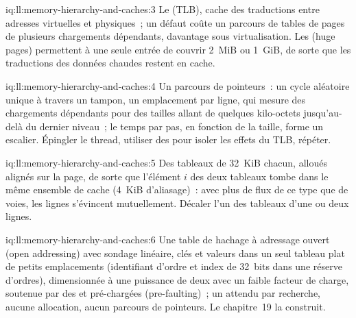 \begin{solution}{iq:ll:memory-hierarchy-and-caches:3}
Le  (TLB), cache des traductions entre adresses virtuelles et physiques~; un défaut coûte un parcours de tables de pages de plusieurs chargements dépendants, davantage sous
virtualisation. Les  (huge pages) permettent à une seule entrée de couvrir 2~MiB ou 1~GiB, de sorte que les traductions des données chaudes restent en cache.
\end{solution}

\begin{solution}{iq:ll:memory-hierarchy-and-caches:4}
Un parcours de pointeurs~: un cycle aléatoire unique à travers un tampon, un emplacement par ligne, qui mesure des chargements dépendants pour des tailles allant de quelques
kilo-octets jusqu'au-delà du dernier niveau~; le temps par pas, en fonction de la taille, forme un escalier. Épingler le thread, utiliser des  pour
isoler les effets du TLB, répéter.
\end{solution}

\begin{solution}{iq:ll:memory-hierarchy-and-caches:5}
Des tableaux de 32~KiB chacun, alloués alignés sur la page, de sorte que l'élément $i$ des deux tableaux tombe dans le même ensemble de cache (4~KiB
d'aliasage)~: avec plus de flux de ce type que de voies, les lignes s'évincent mutuellement. Décaler l'un des tableaux d'une ou deux lignes.
\end{solution}

\begin{solution}{iq:ll:memory-hierarchy-and-caches:6}
Une table de hachage à adressage ouvert (open addressing) avec sondage linéaire, clés et valeurs dans un seul tableau plat de petits emplacements (identifiant d'ordre et
index de 32~bits dans une réserve d'ordres), dimensionnée à une puissance de deux avec un faible facteur de charge, soutenue par des  et
pré-chargées (pre-faulting)~; un  attendu par recherche, aucune allocation, aucun parcours de pointeurs. Le chapitre~19 la construit.
\end{solution}
